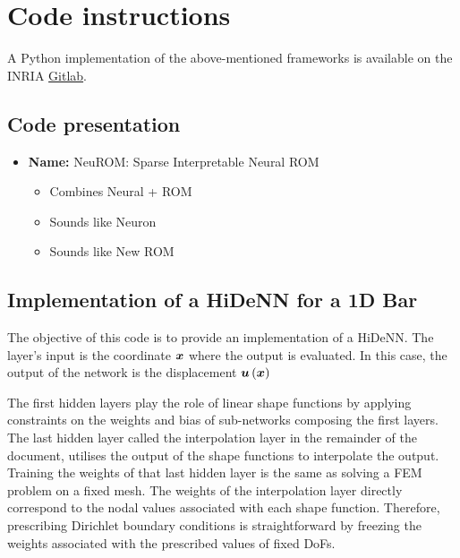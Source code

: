 \chapter[Code instructions]{Code instructions}

\begin{chapabstract}
    A Python implementation of the above-mentioned frameworks is available on the INRIA \href{https://gitlab.inria.fr/aldabyse/hidenn_1d}{Gitlab}.
\end{chapabstract}

\minitoc
\section{Code presentation}

\begin{itemize}
	\item \textcolor{accentcolor}{\textbf{Name:}} NeuROM: Sparse Interpretable Neural ROM
	\begin{itemize}
		\item Combines Neural + ROM
		\item Sounds like Neuron
		\item Sounds like New ROM
	\end{itemize}
\end{itemize}
\section{Implementation of a HiDeNN for a 1D Bar}

The objective of this code is to provide an implementation of a HiDeNN. The layer's input is the coordinate $\boldsymbol{x}$ where the output is evaluated. In this case, the output of the network is the displacement $\boldsymbol{u}\left(\boldsymbol{x}\right)$

The first hidden layers play the role of linear shape functions by applying constraints on the weights and bias of sub-networks composing the first layers. The last hidden layer called the interpolation layer in the remainder of the document, utilises the output of the shape functions to interpolate the output. Training the weights of that last hidden layer is the same as solving a FEM problem on a fixed mesh. The weights of the interpolation layer directly correspond to the nodal values associated with each shape function. Therefore, prescribing Dirichlet boundary conditions is straightforward by freezing the weights associated with the prescribed values of fixed DoFs.

